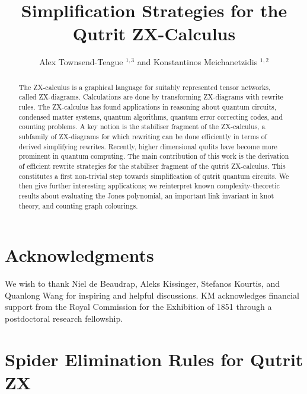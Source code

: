 \documentclass[submission,copyright,creativecommons]{eptcs}
\title{Simplification Strategies for the Qutrit ZX-Calculus}
\author{Alex Townsend-Teague $^{1, 3}$ and Konstantinos Meichanetzidis $^{1,2}$
	\institute{
		$^1$ Department of Computer Science, University of Oxford \\ 
		$^2$ Cambridge Quantum Computing Ltd. \\
		$^3$ Dahlem Center for Complex Quantum Systems, Freie Universit\"{a}t Berlin, 14195 Berlin, Germany}
	}
\begin{document}
\maketitle
\begin{abstract}
	The ZX-calculus is a graphical language for suitably represented tensor networks, called ZX-diagrams.
	Calculations are done by transforming ZX-diagrams with rewrite rules.
	The ZX-calculus has found applications in reasoning about quantum circuits, condensed matter systems, quantum algorithms, quantum error correcting codes, and counting problems.
	A key notion is the stabiliser fragment of the ZX-calculus, a subfamily of ZX-diagrams for which rewriting can be done efficiently in terms of derived simplifying rewrites.
	Recently, higher dimensional qudits have become more prominent in quantum computing.
	The main contribution of this work is the derivation of
	efficient rewrite strategies for the stabiliser fragment of the qutrit ZX-calculus.
	This constitutes a first non-trivial step towards simplification of qutrit quantum circuits. We then give further interesting applications; we reinterpret known complexity-theoretic results about evaluating the Jones polynomial, an important link invariant in knot theory, and counting graph colourings.
\end{abstract}







\section{Acknowledgments}
We wish to thank Niel de Beaudrap, Aleks Kissinger, Stefanos 
Kourtis, and Quanlong Wang for inspiring and helpful discussions.
KM acknowledges financial support from the Royal Commission for the Exhibition of 1851 through a postdoctoral research fellowship.


% 


\appendix



\section{Spider Elimination Rules for Qutrit ZX}




\end{document}
